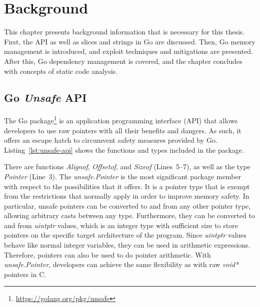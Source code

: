 
\chapter{Background}\label{ch:background}

This chapter presents background information that is necessary for this thesis.
First, the \unsafe{} \acrshort{API} as well as slices and strings in Go are discussed.
Then, Go memory management is introduced, and exploit techniques and mitigations are presented.
After this, Go dependency management is covered, and the chapter concludes with concepts of static code analysis.



\section{Go \textit{Unsafe} API}\label{sec:background:unsafe-api}

The Go \unsafe{} package\footnote{\url{https://golang.org/pkg/unsafe}} is an application programming interface
(\acrshort{API}) that allows developers to use raw pointers with all their benefits and dangers.
As such, it offers an escape hatch to circumvent safety measures provided by Go.
Listing~\ref{lst:unsafe-api} shows the functions and types included in the \unsafe{} package.



There are  functions \textit{Alignof}, \textit{Offsetof}, and \textit{Sizeof} (Lines~5--7),
as well as the type \textit{Pointer} (Line~3).
The \textit{unsafe.Pointer} is the most significant package member with respect to the possibilities that it offers.
It is a pointer type that is exempt from the restrictions that normally apply in order to improve memory safety.
In particular, unsafe pointers can be converted to and from any other pointer type, allowing arbitrary casts between
any type.
Furthermore, they can be converted to and from \textit{uintptr} values, which is an integer type with sufficient size
to store pointers on the specific target architecture of the program.
Since \textit{uintptr} values behave like normal integer variables, they can be used in arithmetic expressions.
Therefore, \unsafe{} pointers can also be used to do pointer arithmetic.
With \textit{unsafe.Pointer}, developers can achieve the same flexibility as with raw \textit{void*} pointers in C.

